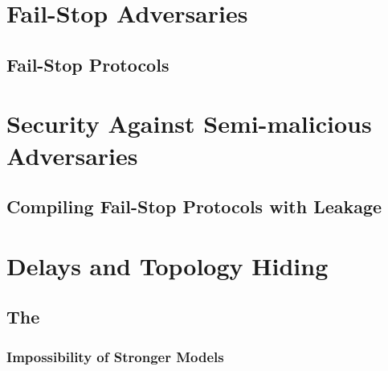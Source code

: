 \section{Fail-Stop Adversaries}

\label{sec:fs-model}

\subsection{Fail-Stop Protocols}\label{sec:FS-protocols}


\section{Security Against Semi-malicious Adversaries}\label{sec:semimal}


\subsection{Compiling Fail-Stop Protocols with Leakage}
\label{sec:composition}


\section{Delays and Topology Hiding}


\subsection{The \delayModel}\label{sec:thcmodel}


\subsubsection{Impossibility of Stronger Models}\label{sec:impossible}


